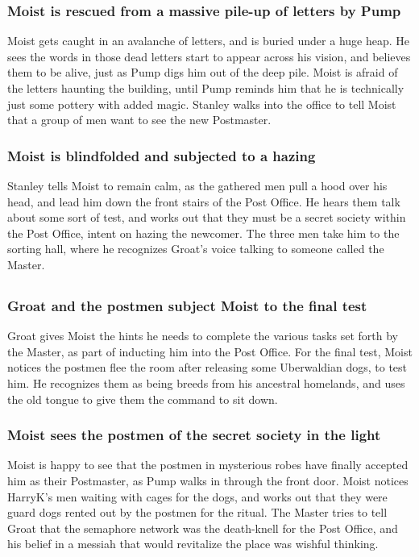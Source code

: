 \subsubsection{\Gls{Moist} is rescued from a massive pile-up of letters by \Gls{Pump}}
\Gls{Moist} gets caught in an avalanche of letters, and is buried under a huge heap. He sees the
words in those dead letters start to appear across his vision, and believes them to be alive, just
as \Gls{Pump} digs him out of the deep pile. \Gls{Moist} is afraid of the letters haunting the
building, until \Gls{Pump} reminds him that he is technically just some pottery with added magic.
\Gls{Stanley} walks into the office to tell \Gls{Moist} that a group of men want to see the new
Postmaster.

\subsubsection{\Gls{Moist} is blindfolded and subjected to a hazing}
\Gls{Stanley} tells \Gls{Moist} to remain calm, as the gathered men pull a hood over his head, and
lead him down the front stairs of the Post Office. He hears them talk about some sort of test, and
works out that they must be a secret society within the Post Office, intent on hazing the newcomer.
The three men take him to the sorting hall, where he recognizes \Gls{Groat}'s voice talking to
someone called the \Gls{Master}.

\subsection{}
\subsubsection{\Gls{Groat} and the postmen subject \Gls{Moist} to the final test}
\Gls{Groat} gives \Gls{Moist} the hints he needs to complete the various tasks set forth by the
\Gls{Master}, as part of inducting him into the Post Office. For the final test, \Gls{Moist} notices
the postmen flee the room after releasing some Uberwaldian dogs, to test him. He recognizes them
as being breeds from his ancestral homelands, and uses the old tongue to give them the command to
sit down.

\subsubsection{\Gls{Moist} sees the postmen of the secret society in the light}
\Gls{Moist} is happy to see that the postmen in mysterious robes have finally accepted him as their
Postmaster, as \Gls{Pump} walks in through the front door. \Gls{Moist} notices \Gls{HarryK}'s men
waiting with cages for the dogs, and works out that they were guard dogs rented out by the postmen
for the ritual. The \Gls{Master} tries to tell \Gls{Groat} that the semaphore network was the
death-knell for the Post Office, and his belief in a messiah that would revitalize the place was
wishful thinking.

